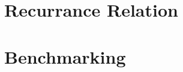 \documentclass{labReport}
\begin{document}
\begin{multicols*}{2}
\section{Recurrance Relation}

\section{Benchmarking}

\end{multicols*}

\end{document}
